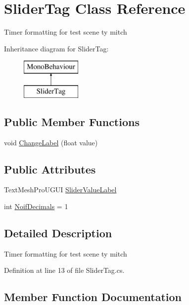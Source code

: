 \hypertarget{class_slider_tag}{}\section{Slider\+Tag Class Reference}
\label{class_slider_tag}


Timer formatting for test scene ty mitch  


Inheritance diagram for Slider\+Tag\+:\begin{figure}[H]
\begin{center}
\leavevmode
\includegraphics[height=2.000000cm]{class_slider_tag}
\end{center}
\end{figure}
\subsection*{Public Member Functions}
\begin{DoxyCompactItemize}
\item 
void \mbox{\hyperlink{class_slider_tag_a87e1f85545ff15edcfe4c8a690d5f5e9}{Change\+Label}} (float value)
\end{DoxyCompactItemize}
\subsection*{Public Attributes}
\begin{DoxyCompactItemize}
\item 
Text\+Mesh\+Pro\+U\+G\+UI \mbox{\hyperlink{class_slider_tag_a6fd7526ecf472c732d82eb66731a6b70}{Slider\+Value\+Label}}
\item 
int \mbox{\hyperlink{class_slider_tag_aeed31b95a2b1060535ca9adadfc51f41}{Noif\+Decimals}} = 1
\end{DoxyCompactItemize}


\subsection{Detailed Description}
Timer formatting for test scene ty mitch 



Definition at line 13 of file Slider\+Tag.\+cs.



\subsection{Member Function Documentation}
\mbox{\label{class_slider_tag_a87e1f85545ff15edcfe4c8a690d5f5e9}} 
